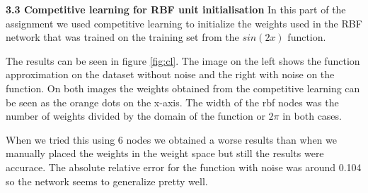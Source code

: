 \documentclass[a4paper]{article}
\begin{document}
\textbf{3.3 Competitive learning for RBF unit initialisation} In this part of the assignment we used competitive learning to initialize the weights used in the RBF network that was trained on the training set from the $sin(2x)$ function.

The results can be seen in figure \ref{fig:cl}. The image on the left shows the function approximation on the dataset without noise and the right with noise on the function. On both images the weights obtained from the competitive learning can be seen as the orange dots on the x-axis. The width of the rbf nodes was the number of weights divided by the domain of the function or $2\pi$ in both cases. 

When we tried this using 6 nodes we obtained a worse results than when we manually placed the weights in the weight space but still the results were accurace. The absolute relative error for the function with noise was around 0.104 so the network seems to generalize pretty well. 
\end{document}
